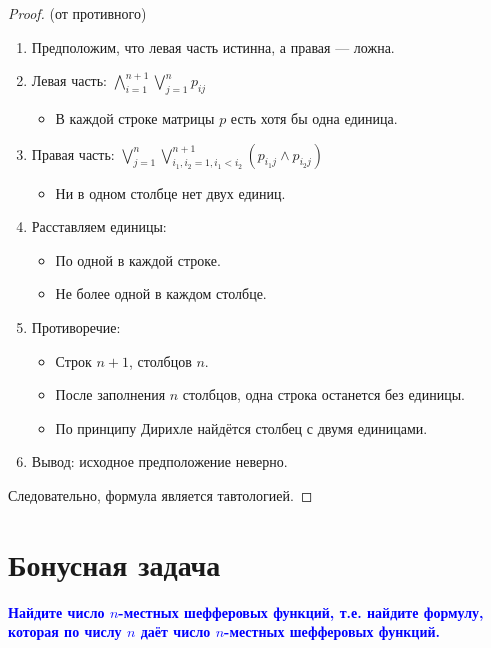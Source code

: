 \documentclass[12pt,a4paper]{article}
\begin{document}
\begin{proof} (от противного)

\begin{enumerate}[label=\arabic*., leftmargin=*]
\item Предположим, что левая часть истинна, а правая — ложна.

\item Левая часть: $\bigwedge_{i=1}^{n+1} \bigvee_{j=1}^n p_{ij}$
   \begin{itemize}
   \item В каждой строке матрицы $p$ есть хотя бы одна единица.
   \end{itemize}

\item Правая часть: $\bigvee_{j=1}^n \bigvee_{i_1, i_2=1, i_1<i_2}^{n+1} (p_{i_1j} \wedge p_{i_2j})$
   \begin{itemize}
   \item Ни в одном столбце нет двух единиц.
   \end{itemize}

\item Расставляем единицы:
   \begin{itemize}
   \item По одной в каждой строке.
   \item Не более одной в каждом столбце.
   \end{itemize}

\item Противоречие:
   \begin{itemize}
   \item Строк $n+1$, столбцов $n$.
   \item После заполнения $n$ столбцов, одна строка останется без единицы.
   \item По принципу Дирихле найдётся столбец с двумя единицами.
   \end{itemize}

\item Вывод: исходное предположение неверно.
\end{enumerate}

Следовательно, формула является тавтологией.
\end{proof}

\section*{Бонусная задача}
\textcolor{blue}{\textbf{Найдите число $n$-местных шефферовых функций, т.е. найдите формулу, которая по числу $n$ даёт число $n$-местных шефферовых функций.}}
\end{document}
